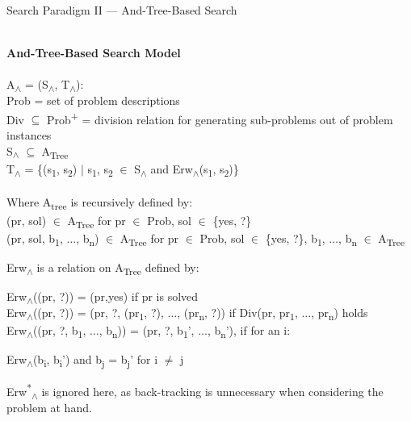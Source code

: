 \documentclass[10pt, oneside]{article}   	%
\begin{document}
\centerline{{\Large Search Paradigm II --- And-Tree-Based Search}}
\noindent \textbf{\\And-Tree-Based Search Model}\\\\
A\textsubscript{$\land$} = (S\textsubscript{$\land$}, T\textsubscript{$\land$}):\\
\indent Prob = set of problem descriptions\\
\indent Div $\subseteq$ Prob\textsuperscript{+} = division relation for generating sub-problems out of problem instances\\
\indent S\textsubscript{$\land$} $\subseteq$ A\textsubscript{Tree}\\
\indent T\textsubscript{$\land$} = \{(s\textsubscript{1}, s\textsubscript{2}) $\vert$ s\textsubscript{1}, s\textsubscript{2} $\in$ S\textsubscript{$\land$} and Erw\textsubscript{$\land$}(s\textsubscript{1}, s\textsubscript{2})\}\\\\
Where A\textsubscript{tree} is recursively defined by:\\
\indent (pr, sol) $\in$ A\textsubscript{Tree} for pr $\in$ Prob, sol $\in$ \{yes, ?\}\\
\indent (pr, sol, b\textsubscript{1}, $\ldots$, b\textsubscript{n}) $\in$ A\textsubscript{Tree} for pr $\in$ Prob, sol $\in$ \{yes, ?\}, b\textsubscript{1}, $\ldots$, b\textsubscript{n} $\in$ A\textsubscript{Tree}

\noindent Erw\textsubscript{$\land$} is a relation on A\textsubscript{Tree} defined by:

\indent Erw\textsubscript{$\land$}((pr, ?)) = (pr,yes) if pr is solved\\
\indent Erw\textsubscript{$\land$}((pr, ?)) = (pr, ?, (pr\textsubscript{1}, ?), $\ldots$, (pr\textsubscript{n}, ?)) if Div(pr, pr\textsubscript{1}, $\ldots$, pr\textsubscript{n}) holds\\
\indent Erw\textsubscript{$\land$}((pr, ?, b\textsubscript{1}, $\ldots$, b\textsubscript{n})) = (pr, ?, b\textsubscript{1}', $\ldots$, b\textsubscript{n}'), if for an i:\\
\centerline{Erw\textsubscript{$\land$}(b\textsubscript{i}, b\textsubscript{i}') and b\textsubscript{j} = b\textsubscript{j}' for i $\neq$ j}

\noindent Erw\textsuperscript{*}\textsubscript{$\land$} is ignored here, as back-tracking is unnecessary when considering the problem at hand.\\
\end{document}
